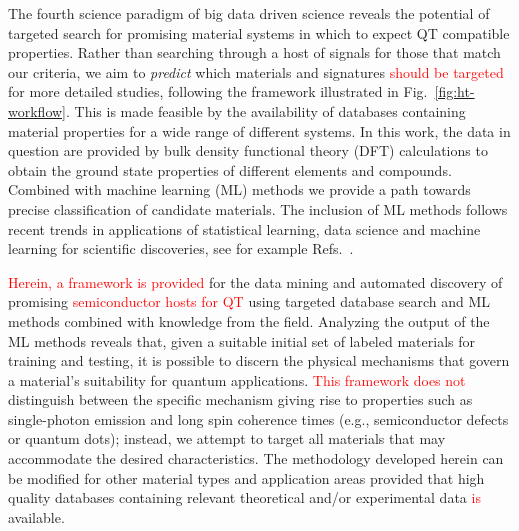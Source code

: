 \documentclass[superscriptaddress,unsortedaddress,
 amsmath,amssymb,
 aps,
]{revtex4-2}
\newcommand{\mrk}[1]{\textcolor{red}{#1}}
\begin{document}
The fourth science paradigm of big data driven science reveals the potential of targeted search for promising material systems in which to expect QT compatible properties. 
Rather than searching through a host of signals for those that match our criteria, we aim to \textit{predict} which materials and signatures \mrk{should be targeted} for more detailed studies, following the framework illustrated in Fig.~\ref{fig:ht-workflow}. 
This is made feasible by the availability of databases containing material properties for a wide range of different systems. In this work, the data in question are provided by bulk density functional theory (DFT) calculations to obtain the ground state properties of different elements and compounds. Combined with machine learning (ML) methods we provide a path towards precise classification of candidate materials. The inclusion of ML methods follows recent trends in applications of statistical learning, data science and machine learning for scientific discoveries, see for example Refs.~\cite{deiana2021,Carleo2019}. 

\mrk{Herein, a framework is provided} for the data mining and automated discovery of promising \mrk{semiconductor hosts for QT} using targeted database search and ML methods combined with knowledge from the field. 
Analyzing the output of the ML methods reveals that, given a suitable initial set of labeled materials for training and testing, it is possible to discern the physical mechanisms that govern a material's suitability for quantum applications.  
\mrk{This framework does not} distinguish between the specific mechanism giving rise to properties such as single-photon emission and long spin coherence times (e.g., semiconductor defects or quantum dots); instead, we attempt to target all materials that may accommodate the desired characteristics.  
The methodology developed herein can be modified for other material types and application areas provided that high quality databases containing relevant theoretical and/or experimental data \mrk{is} available. 
\end{document}
